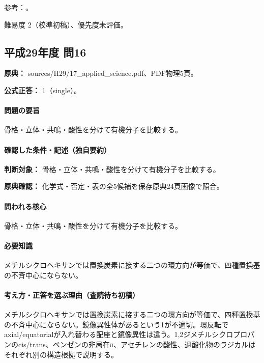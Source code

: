 \par 参考：\cite{organic_chirality,organic_directing}。

\par 難易度 2（校準初稿）、優先度未評価。

\subsection{平成29年度 問16}
\label{q:h29-reg-applied-16}

\noindent\textbf{原典：} sources/H29/17\_applied\_science.pdf、PDF物理5頁。

\textbf{公式正答：} 1（single）。

\paragraph{問題の要旨} 骨格・立体・共鳴・酸性を分けて有機分子を比較する。

\paragraph{確認した条件・記述（独自要約）}\mbox{}\par

\noindent\textbf{判断対象：} 骨格・立体・共鳴・酸性を分けて有機分子を比較する。\par

\noindent\textbf{原典確認：} 化学式・否定・表の全5候補を保存原典24頁画像で照合。\par

\paragraph{問われる核心} 骨格・立体・共鳴・酸性を分けて有機分子を比較する。

\paragraph{必要知識} メチルシクロヘキサンでは置換炭素に接する二つの環方向が等価で、四種置換基の不斉中心にならない。

\paragraph{考え方・正答を選ぶ理由（査読待ち初稿）} メチルシクロヘキサンでは置換炭素に接する二つの環方向が等価で、四種置換基の不斉中心にならない。鏡像異性体があるという1が不適切。環反転でaxial/equatorialが入れ替わる配座と鏡像異性は違う。1,2ジメチルシクロプロパンのcis/trans、ベンゼンの非局在π、アセチレンの酸性、過酸化物のラジカルはそれぞれ別の構造根拠で説明する。

